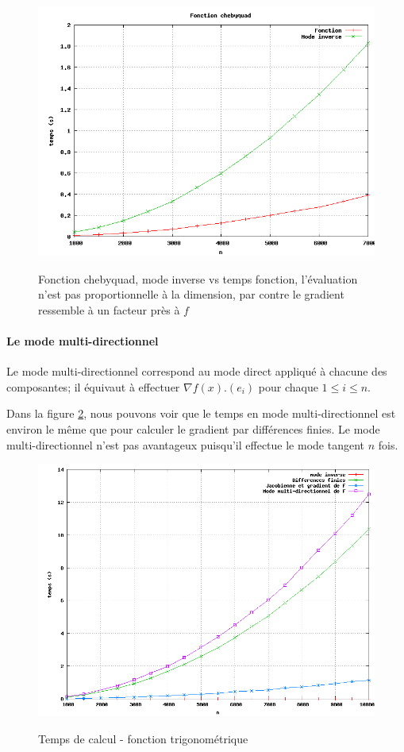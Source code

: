 \begin{figure}
\caption{Fonction chebyquad, mode inverse vs temps fonction, l'\'evaluation n'est pas proportionnelle \`a la dimension, par contre le gradient 
ressemble \`a un facteur pr\`es \`a $f$}
\center
\includegraphics[scale=0.4]{figures/temps6.png}
\label{fig:temps6}
\end{figure}



\paragraph{Le mode multi-directionnel}
Le mode multi-directionnel correspond au mode direct appliqu\'e \`a chacune des composantes;
il \'equivaut \`a effectuer $\nabla f(x).(e_i)$ pour chaque $1\leq i\leq n$.



Dans la figure \ref{fig:temps1}, nous pouvons voir que le temps en mode multi-directionnel est
 environ le même que pour calculer le gradient par diff\'erences finies. Le mode multi-directionnel
n'est pas avantageux puisqu'il effectue le mode tangent $n$ fois.


\begin{figure}
\caption{Temps de calcul - fonction trigonom\'etrique}
\center
\includegraphics[scale=0.4]{figures/temps1.png}
\label{fig:temps1}
\end{figure}

